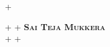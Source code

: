 \documentclass[letterpaper,10pt]{article}                                                                                                                                                                                                                                                                                                                                                                                                                                                                                                                                                                         +
\begin{document}
                                                                                                                                                                                                                                                                                                                                                                                                                                                                                                                                                                                                                   +
 \begin{center}                                                                                                                                                                                                                                                                                                                                                                                                                                                                                                                                                                                                    +
                                                                                                                                                                                                                                                                                                                                                                                                                                                                                                                                                                                                                   +
     \textbf{\Huge \scshape Sai Teja Mukkera} \\ \vspace{2pt}                                                                                                                                                                                                                                                                                                                                                                                                                                                                                                                                                      +
                                                                                                                                                                                                                                                                                                                                                                                                                                                                                                                                                                                                                   +

\end{center}
\end{document}
